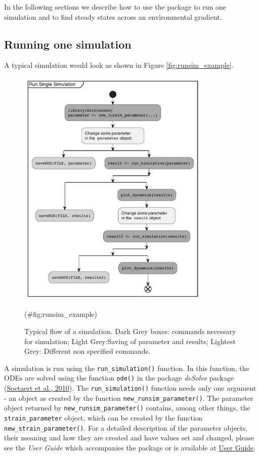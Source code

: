 \documentclass[
]{article}
\begin{document}
In the following sections we describe how to use the package to run one simulation and to find steady states across an environmental gradient.

\hypertarget{running-one-simulation}{%
\subsection{Running one simulation}\label{running-one-simulation}}

A typical simulation would look as shown in Figure \ref{fig:runsim_example}.

\begin{figure}

{\centering \includegraphics[width=350px]{./figures/simflow} 

}

\caption{Typical flow of a simulation. Dark Grey boxes: commands necessary for simulation; Light Grey:Saving of parameter and results; Lightest Grey: Different non specified commands.}(\#fig:runsim_example)
\end{figure}

A simulation is run using the \texttt{run\_simulation()} function. In this function, the ODEs are solved using the function \texttt{ode()} in the package \emph{deSolve} package (\protect\hyperlink{ref-Soetaert2010}{Soetaert et al., 2010}). The \texttt{run\_simulation()} function needs only one argument - an object as created by the function \texttt{new\_runsim\_parameter()}. The parameter object returned by \texttt{new\_runsim\_parameter()} contains, among other things, the \texttt{strain\_parameter} object, which can be created by the function \texttt{new\_strain\_parameter()}. For a detailed description of the parameter objects, their meaning and how they are created and have values set and changed, please see the \emph{User Guide} which accompanies the package or is available at \href{https://uzh-peg.r-universe.dev/articles/microxanox/User-guide.html}{User Guide}.
\end{document}
